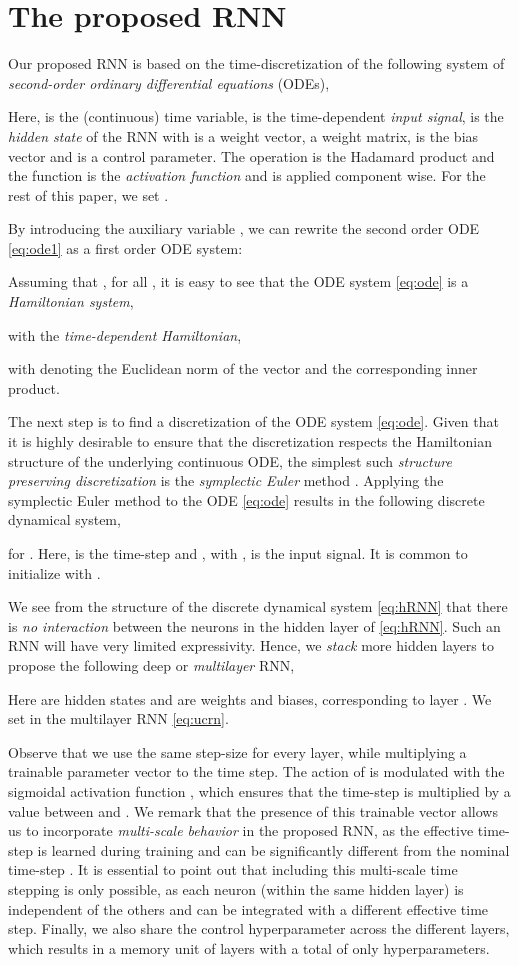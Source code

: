 \documentclass[a4paper]{article}
\begin{document}
\section{The proposed RNN}
Our proposed RNN is based on the time-discretization of the following system of \emph{second-order ordinary differential equations} (ODEs),

Here,  is the (continuous) time variable,  is the time-dependent \emph{input signal},  is the \emph{hidden state} of the RNN with  is a weight vector,  a weight matrix,
 is the bias vector and  is a control parameter. The operation  is the Hadamard product and the function  is the \emph{activation function} and is applied component wise. For the rest of this paper, we set .

By introducing the auxiliary variable , we can rewrite the second order ODE \eqref{eq:ode1} as a first order ODE system:


Assuming that , for all , it is easy to see that the ODE system \eqref{eq:ode} is a \emph{Hamiltonian system},

with the \emph{time-dependent Hamiltonian},

with  denoting the Euclidean norm of the vector  and  the corresponding inner product.

The next step is to find a discretization of the ODE system \eqref{eq:ode}. Given that it is highly desirable to ensure that the discretization respects the Hamiltonian structure of the underlying continuous ODE, the simplest such \emph{structure preserving discretization} is the \emph{symplectic Euler} method \cite{ss1,HLW1}. Applying the symplectic Euler method to the ODE \eqref{eq:ode} results in the following discrete dynamical system,

for . Here,  is the time-step and , with , is the input signal. It is common to initialize with . 

We see from the structure of the discrete dynamical system \eqref{eq:hRNN} that there is \emph{no interaction} between the neurons in the hidden layer of \eqref{eq:hRNN}. Such an RNN will have very limited expressivity. Hence, we \emph{stack} more hidden layers to propose the following deep or \emph{multilayer} RNN,

Here  are hidden states and  are weights and biases, corresponding to layer . We set  in the multilayer RNN \eqref{eq:ucrn}. 

Observe that we use the same step-size  for every layer, while multiplying a trainable parameter vector  to the time step. The action of  is modulated with the sigmoidal activation function , which ensures that the time-step  is multiplied by a value between  and . We remark that the presence of this trainable vector  allows us to incorporate \emph{multi-scale behavior} in the proposed RNN, as the effective time-step is learned during training and can be significantly different from the nominal time-step . It is essential to point out that including this multi-scale time stepping is only possible, as each neuron (within the same hidden layer) is independent of the others and can be integrated with a different effective time step. Finally, we also share the control hyperparameter  across the different layers, which results in a memory unit of  layers with a total of only  hyperparameters. 
\end{document}
